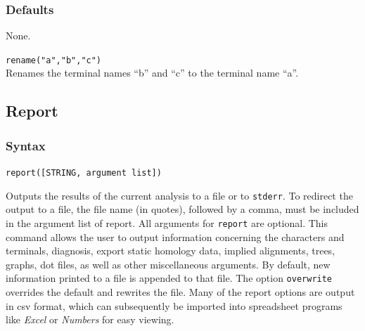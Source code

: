 	\subsubsection{Defaults}
		None.
		
	\begin{example}
	
		\item{\texttt{rename("a","b","c")}\\ Renames the terminal names ``b'' and ``c'' to 
		the terminal name ``a''.}
		
	\end{example}


\subsection{Report}
\label{subsec:report}
	\subsubsection{Syntax}
		\texttt{report([STRING, argument list])}
	
	\begin{phygdescription}
		{Outputs the results of the current analysis to a file or to \texttt{stderr}. To redirect the 
		output to a file, the file name (in quotes), followed by a comma, must be included in 
		the argument list of report. All arguments for \texttt{report} are optional. This command 
		allows the user to output information concerning the characters and terminals, 
		diagnosis, export static homology data, implied alignments, trees, graphs, dot files, 
		as well as other miscellaneous arguments. By default, new information printed to 
		a file is appended to that file. The option \texttt{overwrite} overrides the default and 
		rewrites the file. Many of the report options are output in csv format, which can
		subsequently be imported into spreadsheet programs like \textit{Excel} or 
		\textit{Numbers} for easy viewing.}
	\end{phygdescription}
	
